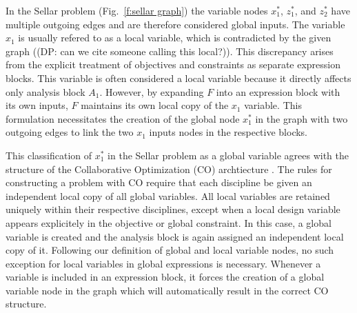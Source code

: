 %

In the Sellar problem (Fig.~\ref{f:sellar graph}) the variable nodes $x_1^*$, $z_1^*$, and $z_2^*$ have multiple outgoing edges and are therefore considered global inputs. 
  The variable $x_1$ is usually refered to as 
  a local variable, which is contradicted by the given graph ((DP: can we cite someone calling this local?)). This discrepancy 
  arises from the explicit treatment of objectives and constraints as separate 
  expression blocks. This variable is often considered a local 
  variable because it directly affects only analysis block $A_1$. However, by expanding
  $F$ into an expression block with its own inputs, $F$ maintains its own local 
  copy of the $x_1$ variable. This formulation necessitates the creation of the global 
  node $x_1^*$ in the graph with two outgoing edges to link the two $x_1$ inputs nodes 
  in the respective blocks. 

This classification of $x_1^*$ in the Sellar problem
  as a global variable agrees with the structure of the Collaborative 
  Optimization (CO) archtiecture \cite{braun1996thesis}. The rules for constructing 
  a problem with CO require that each discipline be given an independent local 
  copy of all global variables. All local variables are retained uniquely 
  within their respective disciplines, except when a local design variable appears 
  explicitely in the objective or global constraint. In this case, a global 
  variable is created and the analysis block is again assigned an 
  independent local copy of it. Following our definition of global and local variable 
  nodes, no such exception for local variables in global expressions is 
  necessary. Whenever a variable is included in an expression block, 
  it forces the creation of a global variable node in the graph which will 
automatically result in the correct CO structure.


